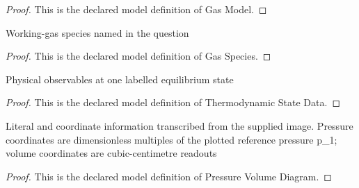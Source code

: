 \begin{proof}
  This is the declared model definition of Gas Model.
\end{proof}
\begin{definition}
  \label{def:physics:phyx-mini-0368:phyxminiproblems-problemphyxmini0368-gasspecies}
  Working-gas species named in the question
\end{definition}
\begin{proof}
  This is the declared model definition of Gas Species.
\end{proof}
\begin{definition}
  \label{def:physics:phyx-mini-0368:phyxminiproblems-problemphyxmini0368-thermodynamicstatedata}
  Physical observables at one labelled equilibrium state
\end{definition}
\begin{proof}
  This is the declared model definition of Thermodynamic State Data.
\end{proof}
\begin{definition}
  \label{def:physics:phyx-mini-0368:phyxminiproblems-problemphyxmini0368-pressurevolumediagram}
  Literal and coordinate information transcribed from the supplied image. Pressure coordinates are dimensionless multiples of the plotted reference pressure p\_1; volume coordinates are cubic-centimetre readouts
\end{definition}
\begin{proof}
  This is the declared model definition of Pressure Volume Diagram.
\end{proof}
